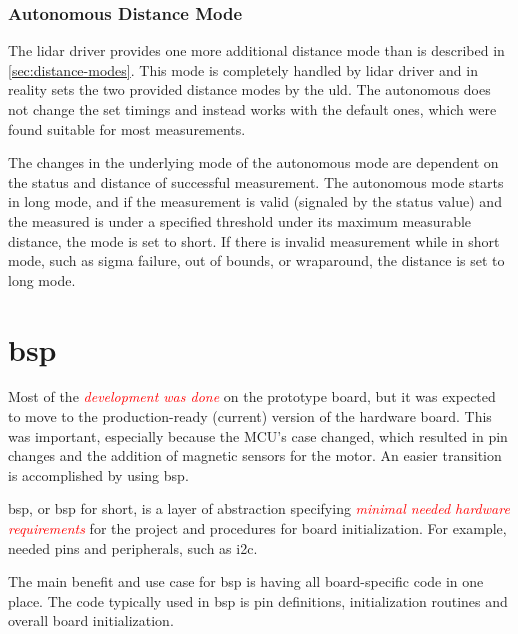 \documentclass[
  digital,     %
  oneside,     %
  nosansbold,  %
  nocolorbold, %
  nolof,         %
  nolot,         %
]{fithesis4}
\newcommand{\TODO}[1]{\textcolor{red}{\textit{#1}}}
\newcommand{\TODOLIST}[1]{}
\begin{document}
{{{\subsection{ Autonomous Distance Mode } \label{sec:lidar-autonomous}

The \acrshort{lidar} driver provides one more additional distance mode than is described in \autoref{sec:distance-modes}. This mode is completely handled by \acrshort{lidar} driver and in reality sets the two provided distance modes by the \acrshort{uld}. The autonomous does not change the set timings and instead works with the default ones, which were found suitable for most measurements.

The changes in the underlying mode of the autonomous mode are dependent on the status and distance of successful measurement. The autonomous mode starts in long mode, and if the measurement is valid (signaled by the status value) and the measured is under a specified threshold under its maximum measurable distance, the mode is set to short. If there is invalid measurement while in short mode, such as sigma failure, out of bounds, or wraparound, the distance is set to long mode.


\chapter[ Board Support Package ]{\acrlong{bsp}} \label{ch:bsp}
\TODOLIST{
\begin{itemize}
    \item \acrshort{bsp} = providing i2c functions to \acrshort{lidar} library + easier portability
    \item \acrshort{bsp} = global namespace \lstinline{Gpio::Pin} initialization is **UB**
\end{itemize}
}

Most of the \TODO{development was done} on the prototype board, but it was expected to move to the production-ready (current) version of the hardware board. This was important, especially because the MCU's case changed, which resulted in pin changes and the addition of magnetic sensors for the motor. An easier transition is accomplished by using \acrshort{bsp}.

\acrlong{bsp}, or \acrshort{bsp} for short, is a layer of abstraction specifying  \TODO{minimal needed hardware requirements} for the project and procedures for board initialization. For example, needed pins and peripherals, such as \acrshort{i2c}. 

The main benefit and use case for \acrshort{bsp} is having all board-specific code in one place. The code typically used in \acrshort{bsp} is pin definitions, initialization routines and overall board initialization.

}}}
\end{document}
